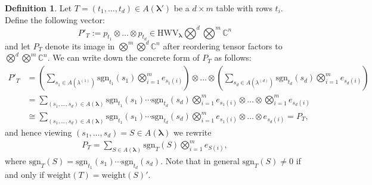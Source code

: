 \documentclass[12pt, reqno]{amsart}
\theoremstyle{definition}
\newtheorem{definition}[theorem]{Definition}
\newcommand{\sgn}{\mathrm{sgn}}
\begin{document}
\begin{definition}
    Let $T = (t_1,\ldots,t_d) \in A(\pmb{\lambda'})$ be a $d \times m$ table with rows $t_i$. Define the following vector:
    $$
        P'_{T} := p_{t_1} \otimes \ldots \otimes p_{t_d} \in \mathrm{HWV}_{\pmb{\lambda}}\bigotimes^{d} \bigotimes^m \mathbb{C}^n
    $$
    and let $P_T$ denote its image in $\bigotimes^m \bigotimes^d \mathbb{C}^n$ after reordering tensor factors to $\bigotimes^d \bigotimes^m  \mathbb{C}^n$.
    We can write down the concrete form of $P_T$ as follows:
    \begin{align*}
        P'_{T}
        &= \left(
            \sum_{s_1 \in A(\lambda^{(1)})} \sgn_{t_1}(s_1) \bigotimes_{i=1}^m e_{s_1(i)}
        \right)
        \otimes\ldots\otimes 
        \left(
            \sum_{s_d \in A(\lambda^{(d)})} \sgn_{t_d}(s_d) \bigotimes_{i=1}^m e_{s_d(i)}
        \right)
            \\
        &= \sum_{(s_{1},\ldots,s_{d}) \in A(\pmb{\lambda})}
        \sgn_{t_1}(s_1)\cdots\sgn_{t_d}(s_d) 
        \bigotimes_{i=1}^m e_{s_1(i)} 
        \otimes \ldots \otimes 
        \bigotimes_{i=1}^m e_{s_d(i)}
        \\
        &\cong 
        \sum_{(s_{1},\ldots,s_{d}) \in A(\pmb{\lambda})}
        \sgn_{t_1}(s_1)\cdots\sgn_{t_d}(s_d) 
        \bigotimes_{i=1}^m 
            e_{s_1(i)} 
            \otimes \ldots \otimes 
            e_{s_d(i)} = P_T,
    \end{align*}
    and hence viewing $(s_1,\ldots,s_d) = S \in A(\pmb{\lambda})$ we rewrite
    \begin{align}
        P_T = \sum_{S \in A(\pmb{\lambda})} \sgn_T(S) \bigotimes_{i=1}^m e_{S(i)}, 
    \end{align}
    where $\sgn_T(S) = \sgn_{t_1}(s_1)\cdots\sgn_{t_d}(s_d)$. Note that in general $\sgn_T(S) \neq 0$ if and only if $\mathrm{weight}(T) = \mathrm{weight}(S)'$.
\end{definition}
\end{document}
